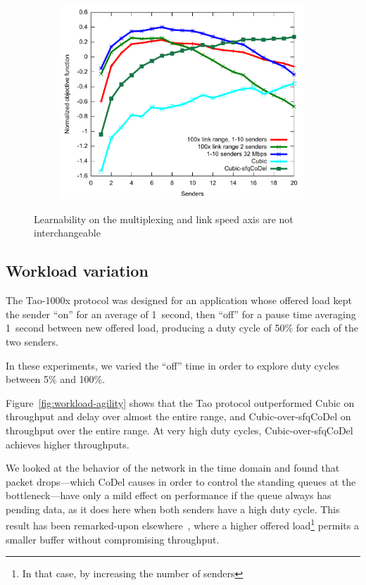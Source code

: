 \begin{figure}
\begin{subfigure}[b]{0.33\textwidth}
\includegraphics[width=\textwidth]{figures/muxing-robust-util.pdf}
\end{subfigure}
\caption{Learnability on the multiplexing and link speed axis are not interchangeable}
\label{fig:multiplex-robustness}
\end{figure}

\subsection{Workload variation}

The Tao-1000x protocol was designed for an application whose offered load
kept the sender ``on'' for an average of 1~second, then ``off'' for a
pause time averaging 1~second between new offered load, producing a
duty cycle of 50\% for each of the two senders.

In these experiments, we varied the ``off'' time in order to explore
duty cycles between 5\% and 100\%.

Figure~\ref{fig:workload-agility} shows that the Tao protocol
outperformed Cubic on throughput and delay over almost the entire
range, and Cubic-over-sfqCoDel on throughput over the entire range. At
very high duty cycles, Cubic-over-sfqCoDel achieves higher
throughputs.

We looked at the behavior of the network in the time domain and found
that packet drops---which CoDel causes in order to control the
standing queues at the bottleneck---have only a mild effect on
performance if the queue always has pending data, as it does here when
both senders have a high duty cycle. This result has been
remarked-upon elsewhere~\cite{router-buffers}, where a higher offered
load\footnote{In that case, by increasing the number of senders}
permits a smaller buffer without compromising throughput.

